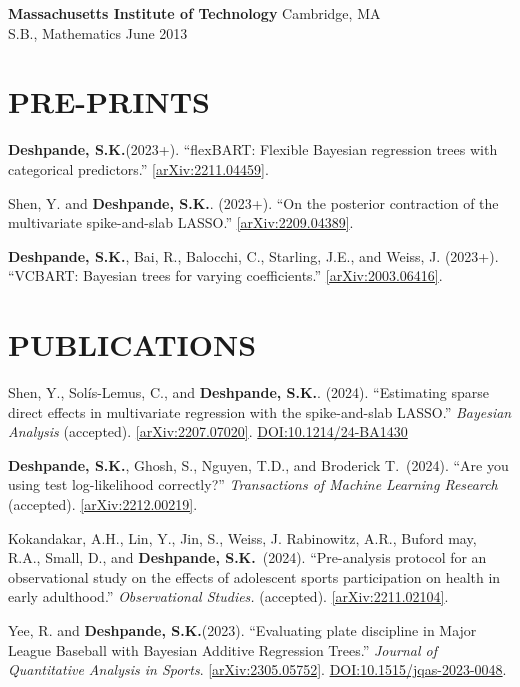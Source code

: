 \documentclass[margin]{res}
\def\skd{\textbf{Deshpande, S.K.}}
\begin{document}
\begin{resume}
                {\bf Massachusetts Institute of Technology} \hfill Cambridge, MA \\
                S.B., Mathematics \hfill June 2013 
  
  
\section{PRE-PRINTS}

\skd (2023+). ``flexBART: Flexible Bayesian regression trees with categorical predictors.'' \href{https://arxiv.org/abs/2211.04459}{[arXiv:2211.04459]}.

Shen, Y. and \skd. (2023+). ``On the posterior contraction of the multivariate spike-and-slab LASSO.'' \href{https://arxiv.org/abs/2209.04389}{[arXiv:2209.04389]}.


\skd, Bai, R., Balocchi, C., Starling, J.E., and Weiss, J. (2023+). ``VCBART: Bayesian trees for varying coefficients.'' \href{https://arxiv.org/abs/2003.06416}{[arXiv:2003.06416]}. %

\section{PUBLICATIONS}

Shen, Y., Sol\'{i}s-Lemus, C., and \skd. (2024). ``Estimating sparse direct effects in multivariate regression with the spike-and-slab LASSO.'' \textit{Bayesian Analysis} (accepted). \href{https://arxiv.org/abs/2207.07020}{[arXiv:2207.07020]}. \href{https://doi.org/10.1214/24-BA1430}{DOI:10.1214/24-BA1430}


\skd, Ghosh, S., Nguyen, T.D., and Broderick T.~(2024). ``Are you using test log-likelihood correctly?'' \textit{Transactions of Machine Learning Research} (accepted). \href{https://arxiv.org/abs/2212.00219}{[arXiv:2212.00219]}.

Kokandakar, A.H., Lin, Y., Jin, S., Weiss, J. Rabinowitz, A.R., Buford may, R.A., Small, D., and \skd~(2024). ``Pre-analysis protocol for an observational study on the effects of adolescent sports participation on health in early adulthood.'' \textit{Observational Studies.} (accepted). \href{https://arxiv.org/abs/2211.02104}{[arXiv:2211.02104]}.

Yee, R. and \skd (2023). ``Evaluating plate discipline in Major League Baseball with Bayesian Additive Regression Trees.'' \textit{Journal of Quantitative Analysis in Sports}. \href{https://arxiv.org/abs/2305.05752}{[arXiv:2305.05752]}. \href{https://doi.org/10.1515/jqas-2023-0048}{DOI:10.1515/jqas-2023-0048}.


\end{resume}
\end{document}
